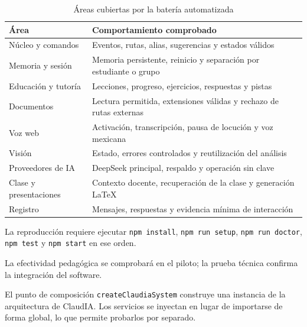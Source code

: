 \documentclass[11pt]{article}
\newcommand{\Section}[1]{\par\vspace{0.16\baselineskip}{\normalfont\normalsize\bfseries\RaggedRight #1\par}}
\newcommand{\Subsection}[1]{\par\vspace{0.12\baselineskip}{\normalfont\normalsize\bfseries\RaggedRight #1\par\vspace{0.07\baselineskip}}}
\begin{document}
\Subsection{Cobertura funcional}
\begin{table}[H]
\centering
\caption{Áreas cubiertas por la batería automatizada}
\begin{tabularx}{\textwidth}{@{}>{\raggedright\arraybackslash}p{1.60in}>{\raggedright\arraybackslash}X@{}}
\toprule
\textbf{Área} & \textbf{Comportamiento comprobado} \\
\midrule
Núcleo y comandos & Eventos, rutas, alias, sugerencias y estados válidos \\
Memoria y sesión & Memoria persistente, reinicio y separación por estudiante o grupo \\
Educación y tutoría & Lecciones, progreso, ejercicios, respuestas y pistas \\
Documentos & Lectura permitida, extensiones válidas y rechazo de rutas externas \\
Voz web & Activación, transcripción, pausa de locución y voz mexicana \\
Visión & Estado, errores controlados y reutilización del análisis \\
Proveedores de IA & DeepSeek principal, respaldo y operación sin clave \\
Clase y presentaciones & Contexto docente, recuperación de la clase y generación LaTeX \\
Registro & Mensajes, respuestas y evidencia mínima de interacción \\
\bottomrule
\end{tabularx}
\end{table}

La reproducción requiere ejecutar \texttt{npm install}, \texttt{npm run setup},
\texttt{npm run doctor}, \texttt{npm test} y \texttt{npm start} en ese orden.

La efectividad pedagógica se comprobará en el piloto; la prueba técnica confirma la integración del software.

\clearpage

\Section{Anexo C. Arquitectura del repositorio}

El punto de composición \texttt{createClaudiaSystem} construye una instancia de la arquitectura de ClaudIA. Los servicios se inyectan en lugar de importarse de forma global, lo que permite probarlos por separado.
\end{document}
